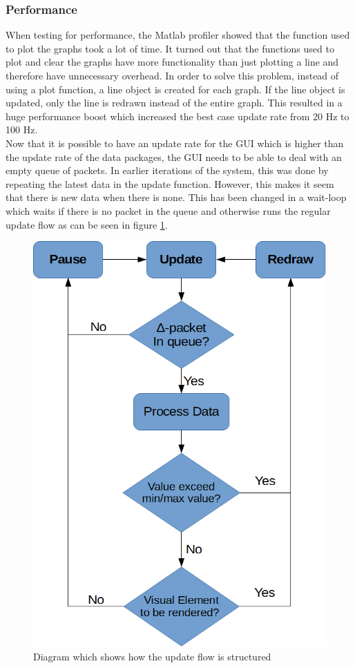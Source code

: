 \subsubsection{Performance}
\label{sec:PerfS4}
When testing for performance, the Matlab profiler showed that the function used to plot the graphs took a lot of time. It turned out that the functions used to plot and clear the graphs have more functionality than just plotting a line and therefore have 	unnecessary overhead. In order to solve this problem, instead of using a plot function, a line object is created for each graph. If the line object is updated, only the line is redrawn instead of the entire graph. This resulted in a huge performance boost which increased the best case update rate from 20 Hz to 100 Hz.\\

Now that it is possible to have an update rate for the GUI which is higher than the update rate of the data packages, the GUI needs to be able to deal with an empty queue of packets. In earlier iterations of the system, this was done by repeating the latest data in the update function. However, this makes it seem that there is new data when there is none. This has been changed in a wait-loop which waits if there is no packet in the queue and otherwise runs the regular update flow as can be seen in figure \ref{fig:UpdateFlow}. 
\begin{figure}[H]
	\centering
	\includegraphics[width=.6\textwidth, height=0.5\textheight]{images/UpdateFlow}
	\caption{Diagram which shows how the update flow is structured} 
	\label{fig:UpdateFlow}
\end{figure} 
